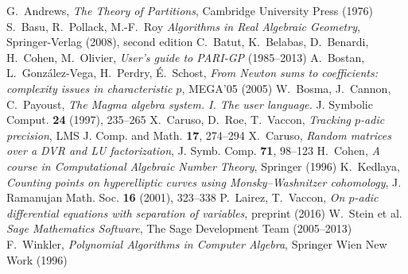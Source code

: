 \documentclass{jT}
\numberwithin{equation}{section}
\theoremstyle{definition}
\begin{document}
\def\refname{\centerline{Bibliographie}}

\begin{thebibliography}{99}
{}
  G.~Andrews,
  \emph{The Theory of Partitions},
  Cambridge University Press (1976)
  S.~Basu, R.~Pollack, M.-F.~Roy
  \emph{Algorithms in Real Algebraic Geometry},
  Springer-Verlag (2008), second edition
  C.~Batut, K.~Belabas, D.~Benardi, H.~Cohen, M.~Olivier, 
  \emph{User’s guide to PARI-GP} (1985--2013)
  A.~Bostan, L.~Gonz\'alez-Vega, H.~Perdry, É.~Schost, 
  \emph{From Newton sums to coefficients: complexity issues in characteristic $p$}, 
  MEGA’05 (2005)
  W.~Bosma, J.~Cannon, C.~Payoust, 
  \emph{The Magma algebra system. I. The user language.}
  J. Symbolic Comput. {\bf 24} (1997), 235--265
  X.~Caruso, D.~Roe, T.~Vaccon,
  \emph{Tracking $p$-adic precision},
  LMS J. Comp. and Math. {\bf 17}, 274--294
  X.~Caruso,
  \emph{Random matrices over a DVR and LU factorization},
  J. Symb. Comp. {\bf 71}, 98--123
  H.~Cohen,
  \emph{A course in Computational Algebraic Number Theory},
  Springer (1996)
  K.~Kedlaya,
  \emph{Counting points on hyperelliptic curves using Monsky--Washnitzer cohomology}, 
  J. Ramanujan Math. Soc. {\bf 16} (2001), 323--338
  P.~Lairez, T.~Vaccon,
  \emph{On $p$-adic differential equations with separation of variables},
  preprint (2016)
  W.~Stein et al.
  \emph{Sage Mathematics Software}, 
  The Sage Development Team (2005--2013)
  F.~Winkler,
  \emph{Polynomial Algorithms in Computer Algebra},
  Springer Wien New Work (1996)
\end{thebibliography}
\end{document}
